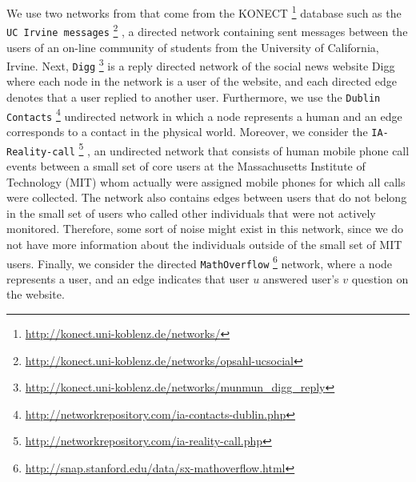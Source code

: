 \documentclass{acm_proc_article-sp}
\begin{document}


We use two networks from that come from the KONECT \footnote{\url{http://konect.uni-koblenz.de/networks/}} database such as the \texttt{UC Irvine messages} \footnote{\url{http://konect.uni-koblenz.de/networks/opsahl-ucsocial}} \cite{opsahl2009clustering}, a directed network containing sent messages between the users of an on-line community of students from the University of California, Irvine. Next, \texttt{Digg} \footnote{\url{http://konect.uni-koblenz.de/networks/munmun_digg_reply}}\cite{de2009social} is a reply directed network of the social news website Digg where each node in the network is a user of the website, and each directed edge denotes that a user replied to another user. Furthermore, we use the \texttt{Dublin Contacts} \footnote{\url{http://networkrepository.com/ia-contacts-dublin.php}} \cite{nr} undirected network in which a node represents a human and an edge corresponds to a contact in the physical world. Moreover, we consider the \texttt{IA-Reality-call} \footnote{\url{http://networkrepository.com/ia-reality-call.php}} \cite{eagle2006reality}, \cite{nr} an undirected network that consists of human mobile phone call events between a small set of core users at the Massachusetts Institute of Technology (MIT) whom actually were assigned mobile phones for which all calls were collected. The network also contains edges between users that do not belong in the small set of users who called other individuals that were not actively monitored. Therefore, some sort of noise might exist in this network, since we do not have more information about the individuals outside of the small set of MIT users. Finally, we consider the directed \texttt{MathOverflow} \footnote{\url{http://snap.stanford.edu/data/sx-mathoverflow.html}} \cite{Paranjape:2017:MTN:3018661.3018731} network, where a node represents a user, and an edge indicates that user $u$ answered user's $v$ question on the website.
\end{document}

